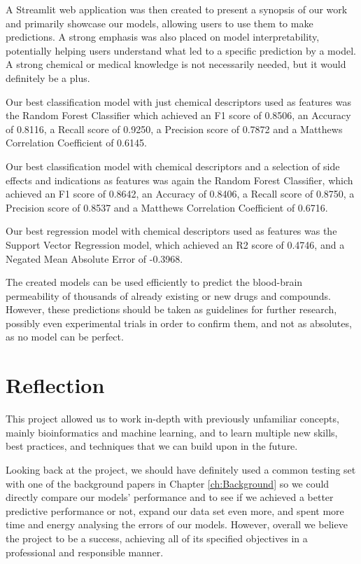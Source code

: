 A Streamlit web application was then created to present a synopsis of our work and primarily showcase our models, allowing users to use them to make predictions. A strong emphasis was also placed on model interpretability, potentially helping users understand what led to a specific prediction by a model. A strong chemical or medical knowledge is not necessarily needed, but it would definitely be a plus. 

Our best classification model with just chemical descriptors used as features was the Random Forest Classifier which achieved an F1 score of 0.8506, an Accuracy of 0.8116, a Recall score of 0.9250, a Precision score of 0.7872 and a Matthews Correlation Coefficient of 0.6145.

Our best classification model with chemical descriptors and a selection of side effects and indications as features was again the Random Forest Classifier, which achieved an F1 score of 0.8642, an Accuracy of 0.8406, a Recall score of 0.8750, a Precision score of 0.8537 and a Matthews Correlation Coefficient of 0.6716.

Our best regression model with chemical descriptors used as features was the Support Vector Regression model, which achieved an R2 score of 0.4746, and a Negated Mean Absolute Error of -0.3968.

The created models can be used efficiently to predict the blood-brain permeability of thousands of already existing or new drugs and compounds. However, these predictions should be taken as guidelines for further research, possibly even experimental trials in order to confirm them, and not as absolutes, as no model can be perfect.

\section{Reflection}

This project allowed us to work in-depth with previously unfamiliar concepts, mainly bioinformatics and machine learning, and to learn multiple new skills, best practices, and techniques that we can build upon in the future. 

Looking back at the project, we should have definitely used a common testing set with one of the background papers in Chapter \ref{ch:Background} so we could directly compare our models' performance and to see if we achieved a better predictive performance or not, expand our data set even more, and spent more time and energy analysing the errors of our models. However, overall we believe the project to be a success, achieving all of its specified objectives in a professional and responsible manner.

